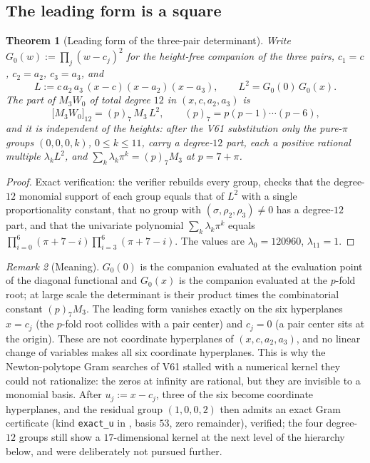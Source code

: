 \documentclass[11pt]{article}
\newtheorem{theorem}{Theorem}[section]
\theoremstyle{definition}
\theoremstyle{remark}
\newtheorem{remark}[theorem]{Remark}
\begin{document}
\subsection{The leading form is a square}

\begin{theorem}[Leading form of the three-pair determinant]
\label{thm:f2v68-leading}
Write \(G_0(w):=\prod_{j}(w-c_j)^2\) for the height-free companion of the
three pairs, \(c_1=c\), \(c_2=a_2\), \(c_3=a_3\), and
\begin{equation}
 L:=c\,a_2\,a_3\,(x-c)(x-a_2)(x-a_3),\qquad L^2=G_0(0)\,G_0(x).
 \label{eq:f2v68-L}
\end{equation}
The part of \(M_3W_0\) of total degree \(12\) in \((x,c,a_2,a_3)\) is
\begin{equation}
 \boxed{\,\bigl[M_3W_0\bigr]_{12}=(p)_7\,M_3\,L^2,\qquad
 (p)_7=p(p-1)\cdots(p-6),}
 \label{eq:f2v68-leading}
\end{equation}
and it is independent of the heights: after the V61 substitution only the
pure-\(\pi\) groups \((0,0,0,k)\), \(0\le k\le11\), carry a degree-\(12\)
part, each a positive rational multiple \(\lambda_k L^2\), and
\(\sum_k\lambda_k\pi^k=(p)_7M_3\) at \(p=7+\pi\).
\end{theorem}

\begin{proof}
Exact verification: the verifier rebuilds every group, checks that the
degree-\(12\) monomial support of each group equals that of \(L^2\) with a
single proportionality constant, that no group with
\((\sigma,\rho_2,\rho_3)\ne0\) has a degree-\(12\) part, and that the
univariate polynomial \(\sum_k\lambda_k\pi^k\) equals
\(\prod_{i=0}^{6}(\pi+7-i)\prod_{i=3}^{6}(\pi+7-i)\).  The values are
\(\lambda_0=120960\), \(\lambda_{11}=1\).
\end{proof}

\begin{remark}[Meaning]
\label{rem:f2v68-meaning}
\(G_0(0)\) is the companion evaluated at the evaluation point of the
diagonal functional and \(G_0(x)\) is the companion evaluated at the
\(p\)-fold root; at large scale the determinant is their product times
the combinatorial constant \((p)_7M_3\).  The leading form vanishes
exactly on the six hyperplanes \(x=c_j\) (the \(p\)-fold root collides
with a pair center) and \(c_j=0\) (a pair center sits at the origin).
These are not coordinate hyperplanes of \((x,c,a_2,a_3)\), and no linear
change of variables makes all six coordinate hyperplanes.  This is why
the Newton-polytope Gram searches of V61 stalled with a numerical kernel
they could not rationalize: the zeros at infinity are rational, but they
are invisible to a monomial basis.  After \(u_j:=x-c_j\), three of the
six become coordinate hyperplanes, and the residual group \((1,0,0,2)\)
then admits an exact Gram certificate (kind \texttt{exact\_u} in
, basis \(53\),
zero remainder), verified; the four degree-\(12\) groups still show a
\(17\)-dimensional kernel at the next level of the hierarchy below, and
were deliberately not pursued further.
\end{remark}
\end{document}
